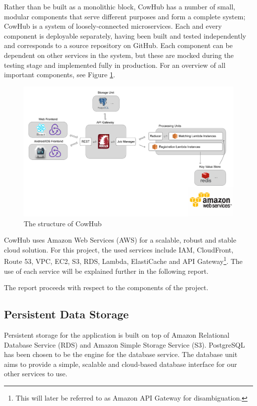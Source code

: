 Rather than be built as a monolithic block, CowHub has a number of small, modular components that serve different purposes and form a complete system; CowHub is a system of loosely-connected microservices. Each and every component is deployable separately, having been built and tested independently and corresponds to a source repository on GitHub. Each component can be dependent on other services in the system, but these are mocked during the testing stage and implemented fully in production. For an overview of all important components, see Figure \ref{fig:structure}.

\begin{figure}
  \includegraphics[width=\textwidth]{sketch/structure.pdf}
  \caption{The structure of CowHub}
  \label{fig:structure}
\end{figure}

CowHub uses Amazon Web Services (AWS) for a scalable, robust and stable cloud solution. For this project, the used services include IAM, CloudFront, Route 53, VPC, EC2, S3, RDS, Lambda, ElastiCache and API Gateway\footnote{This will later be referred to as Amazon API Gateway for disambiguation.}. The use of each service will be explained further in the following report.

The report proceeds with respect to the components of the project.

\subsection{Persistent Data Storage}
Persistent storage for the application is built on top of Amazon Relational Database Service (RDS) and Amazon Simple Storage Service (S3). PostgreSQL has been chosen to be the engine for the database service. The database unit aims to provide a simple, scalable and cloud-based database interface for our other services to use.

